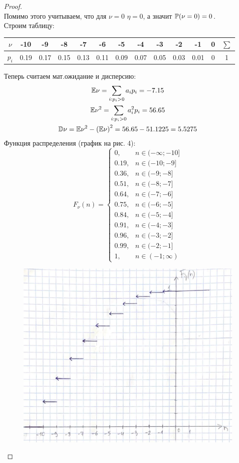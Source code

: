 \begin{proof}
\[\]
Помимо этого учитываем, что для $\nu = 0$ $\eta = 0$, а значит $\mathbb P(\nu = 0) = 0$.\\
Строим таблицу:\\
\begin{table}[h!]
    \centering
    \begin{tabular}{|c|c|c|c|c|c|c|c|c|c|c|c|c|}
    \hline
        $\nu$ & -10 & -9 & -8 & -7 & -6 & -5 & -4 & -3 & -2 & -1 & 0 & $\sum$\\
    \hline
        $p_i$ & 0.19 & 0.17 & 0.15 & 0.13 & 0.11 & 0.09 & 0.07 & 0.05 & 0.03 & 0.01 & 0 & 1\\
    \hline
    \end{tabular}
\end{table}

Теперь считаем мат.ожидание и дисперсию:
\begin{gather*}
    \mathbb E\nu = \sum_{i: p_i > 0}a_ip_i = -7.15\\
    \mathbb E\nu^2 = \sum_{i: p_i > 0}a_i^2p_i = 56.65\\
    \mathbb D\nu = \mathbb E\nu^2 - \left(\mathbb E\nu\right)^2 = 56.65 - 51.1225 = 5.5275
\end{gather*}
Функция распределения (график на рис. 4):
\[
F_{\nu}(n) = \begin{cases}
    0, & n\in (-\infty;-10]\\
    0.19, & n\in (-10;-9]\\
    0.36, & n\in (-9;-8]\\
    0.51, & n\in (-8;-7]\\
    0.64, & n\in (-7;-6]\\
    0.75, & n\in (-6;-5]\\
    0.84, & n\in (-5;-4]\\
    0.91, & n\in (-4;-3]\\
    0.96, & n\in (-3;-2]\\
    0.99, & n\in (-2;-1]\\
    1, & n\in (-1;\infty)
\end{cases}
\]
\begin{figure}[h!]
    \centering
    \includegraphics[width=0.5\linewidth]{4.jpeg}
    \caption{}
    \label{fig:enter-label}
\end{figure}
\end{proof}

